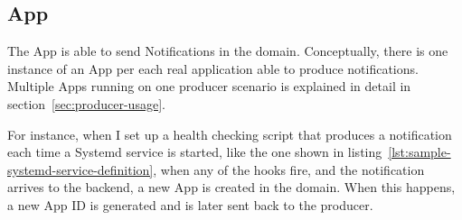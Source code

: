 \subsection{App}\label{sec:app}

The App is able to send Notifications
in the domain.
Conceptually,
there is one instance of an App
per each real application
able to produce notifications.
Multiple Apps running on one producer scenario
is explained in detail in section~\ref{sec:producer-usage}.

For instance,
when I set up a health checking script
that produces a notification each time
a Systemd service is started,
like the one shown in listing~\ref{lst:sample-systemd-service-definition},
when any of the hooks fire,
and the notification arrives to the backend,
a new App is created in the domain.
When this happens,
a new App \ac{ID} is generated
and is later sent back to the producer.
